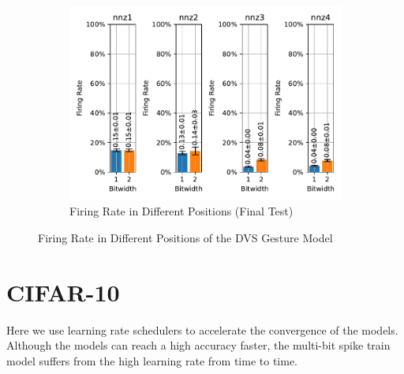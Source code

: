         \begin{figure}[H]
            \centering
            \ContinuedFloat
            \begin{subfigure}[H]{\textwidth}
                \centering
                \includegraphics[width=\textwidth]{../firerate/DVSGesture/plots/dvsgesture_final_firerate.pdf}
                \caption{Firing Rate in Different Positions (Final Test)}
            \end{subfigure}
            \caption{Firing Rate in Different Positions of the DVS Gesture Model}
        \end{figure}

    \section{CIFAR-10}
    \label{appendix:firerate_cifar10}
        Here we use learning rate schedulers to accelerate the convergence of the models. Although the models can reach a high accuracy faster, the multi-bit spike train model suffers from the high learning rate from time to time. 

